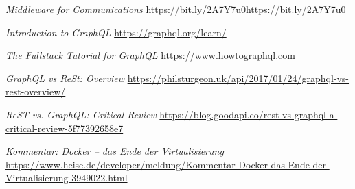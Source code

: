 \documentclass[10pt,journal,compsoc]{IEEEtran}
\begin{document}
%
%
%
\begin{thebibliography}{1}

\emph{Middleware for Communications}
\url{https://bit.ly/2A7Y7u0https://bit.ly/2A7Y7u0}

\emph{Introduction to GraphQL}
\url{https://graphql.org/learn/}
  
\emph{The Fullstack Tutorial for GraphQL}
\url{https://www.howtographql.com}

\emph{GraphQL vs ReSt: Overview}
\url{https://philsturgeon.uk/api/2017/01/24/graphql-vs-rest-overview/}

\emph{ReST vs. GraphQL: Critical Review}
\url{https://blog.goodapi.co/rest-vs-graphql-a-critical-review-5f77392658e7}

\emph{Kommentar: Docker – das Ende der Virtualisierung}
\url{https://www.heise.de/developer/meldung/Kommentar-Docker-das-Ende-der-Virtualisierung-3949022.html}




\end{thebibliography}

% 
\end{document}
